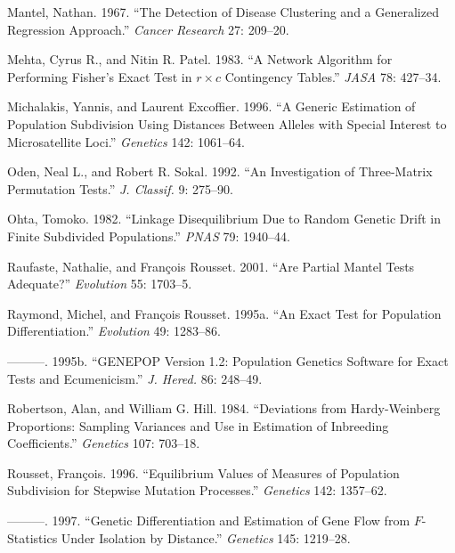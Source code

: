\documentclass[
  12pt,
]{book}
\newlength{\cslhangindent}
\newlength{\cslentryspacingunit} %
\newenvironment{CSLReferences}[2] %
 {%
  \setlength{\parindent}{0pt}
  \ifodd #1
  \let\oldpar\par
  \def\par{\hangindent=\cslhangindent\oldpar}
  \fi
  \setlength{\parskip}{#2\cslentryspacingunit}
 }%
 {}
\begin{document}
\begin{CSLReferences}{1}{0}
\leavevmode{}%
Mantel, Nathan. 1967. {``The Detection of Disease Clustering and a Generalized Regression Approach.''} \emph{Cancer Research} 27: 209--20.

\leavevmode{}%
Mehta, Cyrus R., and Nitin R. Patel. 1983. {``A Network Algorithm for Performing {F}isher's Exact Test in \(r \times
	c\) Contingency Tables.''} \emph{JASA} 78: 427--34.

\leavevmode{}%
Michalakis, Yannis, and Laurent Excoffier. 1996. {``A Generic Estimation of Population Subdivision Using Distances Between Alleles with Special Interest to Microsatellite Loci.''} \emph{Genetics} 142: 1061--64.

\leavevmode{}%
Oden, Neal L., and Robert R. Sokal. 1992. {``An Investigation of Three-Matrix Permutation Tests.''} \emph{J. Classif.} 9: 275--90.

\leavevmode{}%
Ohta, Tomoko. 1982. {``Linkage Disequilibrium Due to Random Genetic Drift in Finite Subdivided Populations.''} \emph{PNAS} 79: 1940--44.

\leavevmode{}%
Raufaste, Nathalie, and François Rousset. 2001. {``Are Partial Mantel Tests Adequate?''} \emph{Evolution} 55: 1703--5.

\leavevmode{}%
Raymond, Michel, and François Rousset. 1995a. {``An Exact Test for Population Differentiation.''} \emph{Evolution} 49: 1283--86.

\leavevmode{}%
---------. 1995b. {``{GENEPOP} {V}ersion 1.2: Population Genetics Software for Exact Tests and Ecumenicism.''} \emph{J. Hered.} 86: 248--49.

\leavevmode{}%
Robertson, Alan, and William G. Hill. 1984. {``Deviations from {H}ardy-{W}einberg Proportions: Sampling Variances and Use in Estimation of Inbreeding Coefficients.''} \emph{Genetics} 107: 703--18.

\leavevmode{}%
Rousset, François. 1996. {``Equilibrium Values of Measures of Population Subdivision for Stepwise Mutation Processes.''} \emph{Genetics} 142: 1357--62.

\leavevmode{}%
---------. 1997. {``Genetic Differentiation and Estimation of Gene Flow from \(F\)-Statistics Under Isolation by Distance.''} \emph{Genetics} 145: 1219--28.


\end{CSLReferences}
\end{document}
